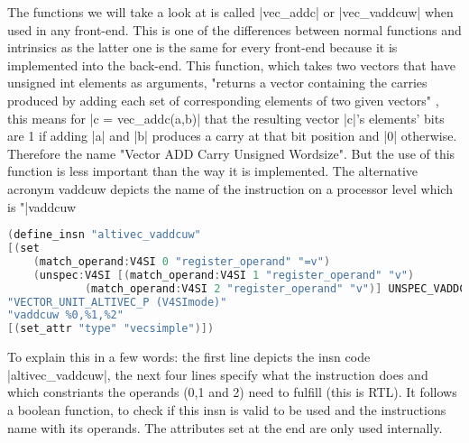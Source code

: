 The functions we will take a look at is called |vec_addc| or |vec_vaddcuw| when used in any front-end. This is one of the differences between normal functions and intrinsics as the latter one is the same for every front-end because it is implemented into the back-end.
This function, which takes two vectors that have unsigned int elements as arguments, "returns a vector containing the carries produced by adding each set of corresponding elements of two given vectors" , this means for |c = vec_addc(a,b)| that the resulting vector |c|'s elements' bits are 1 if adding |a| and |b| produces a carry at that bit position and |0| otherwise. Therefore the name "Vector ADD Carry Unsigned Wordsize". But the use of this function is less important than the way it is implemented.
The alternative acronym vaddcuw depicts the name of the instruction on a processor level which is "|vaddcuw  %
\begin{lstlisting}[language=C++,basicstyle=\ttfamily\scriptsize,keywordstyle=\color{red}]
(define_insn "altivec_vaddcuw"
[(set
	(match_operand:V4SI 0 "register_operand" "=v")
	(unspec:V4SI [(match_operand:V4SI 1 "register_operand" "v")
			(match_operand:V4SI 2 "register_operand" "v")] UNSPEC_VADDCUW))]
"VECTOR_UNIT_ALTIVEC_P (V4SImode)"
"vaddcuw %0,%1,%2"
[(set_attr "type" "vecsimple")])
\end{lstlisting}
To explain this in a few words: the first line depicts the insn code |altivec_vaddcuw|, the next four lines specify what the instruction does and which constriants the operands (0,1 and 2) need to fulfill (this is RTL). It follows a boolean function, to check if this insn is valid to be used and the instructions name with its operands. The attributes set at the end are only used internally.

